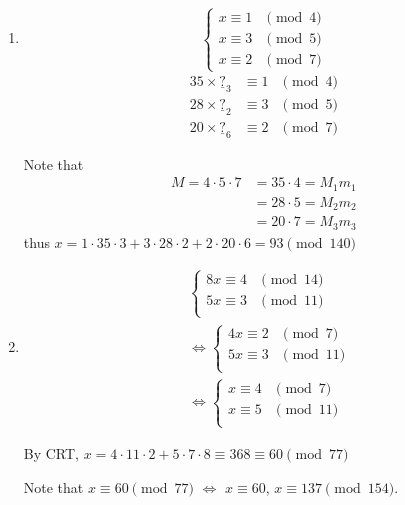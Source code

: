 \begin{example}
    \begin{enumerate}
        \item \[
            \begin{cases}
                x \equiv 1 & \pmod{4} \\
                x \equiv 3 & \pmod{5} \\
                x \equiv 2 & \pmod{7}
            \end{cases}    
        \]
        \begin{align*}
            35 \times \underline{?}_\text{3} &\equiv 1 & \pmod{4}\\
            28 \times \underline{?}_\text{2} &\equiv 3 & \pmod{5}\\
            20 \times \underline{?}_\text{6} &\equiv 2 & \pmod{7}
        \end{align*}
        
        Note that
        \begin{align*}
            M=4\cdot 5\cdot 7 &= 35 \cdot 4 = M_1m_1 \\
            &= 28 \cdot 5 = M_2m_2 \\
            &= 20 \cdot 7 = M_3m_3
        \end{align*}
        thus $x=1\cdot 35\cdot 3 + 3\cdot 28\cdot 2 + 2 \cdot 20 \cdot 6 = 93\pmod{140}$
        \item \begin{align*}
            & \begin{cases}
                8x \equiv 4 & \pmod{14} \\
                5x \equiv 3 & \pmod{11} \\
            \end{cases} \\
            & \Leftrightarrow \begin{cases}
                4x \equiv 2 & \pmod{7} \\
                5x \equiv 3 & \pmod{11} \\
            \end{cases} \\
            & \Leftrightarrow \begin{cases}
                x \equiv 4 & \pmod{7} \\
                x \equiv 5 & \pmod{11} \\
            \end{cases}
        \end{align*}

        By CRT, $x=4 \cdot 11 \cdot 2 + 5 \cdot 7 \cdot 8 \equiv 368 \equiv 60\pmod{77}$

        Note that $x \equiv 60\pmod{77}$ $\Leftrightarrow$ $x \equiv 60$, $x \equiv 137\pmod{154}$.
    \end{enumerate}
\end{example}